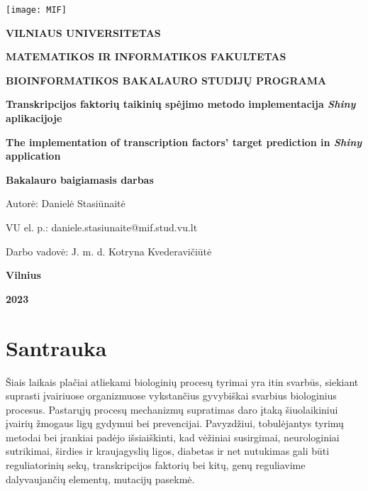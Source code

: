 \documentclass[12pt]{article}
\begin{document}

\begin{titlepage}
\vskip 20pt
\begin{center}
\texttt{[image: MIF]}
\end{center}


\vskip 20pt
\centerline{\bf \large \textbf{VILNIAUS UNIVERSITETAS}}
\bigskip
\centerline{\large \textbf{MATEMATIKOS IR INFORMATIKOS FAKULTETAS}}
\bigskip
\centerline{\large \textbf{BIOINFORMATIKOS BAKALAURO STUDIJŲ PROGRAMA}}



\vskip 90pt
\begin{center}
    {\bf \LARGE Transkripcijos faktorių taikinių spėjimo metodo implementacija
    \emph{Shiny} aplikacijoje}
\end{center}
\begin{center}
    {\bf \Large The implementation of transcription factors' target prediction
    in \emph{Shiny} application}
\end{center}
\vskip 20pt
\centerline{\bf \large \textbf{Bakalauro baigiamasis darbas}}
\bigskip
\vskip 40pt

\hskip 140pt {\large Autorė: Danielė Stasiūnaitė}

\hskip 140pt{\large VU el. p.: daniele.stasiunaite@mif.stud.vu.lt}
\bigskip
\vskip 20pt

\hskip 140pt {\large Darbo vadovė: J. m. d. Kotryna Kvederavičiūtė}
\vskip 60pt
\vskip 40pt
\centerline{\large \textbf{Vilnius}}
\centerline{\large \textbf{2023}}
\newpage
\end{titlepage}



\tableofcontents
\newpage


\section*{Santrauka}
Šiais laikais plačiai atliekami biologinių procesų tyrimai yra itin svarbūs,
siekiant suprasti įvairiuose organizmuose vykstančius gyvybiškai svarbius
biologinius procesus. Pastarųjų
procesų mechanizmų supratimas daro įtaką šiuolaikiniui įvairių žmogaus ligų
gydymui bei prevencijai. Pavyzdžiui, tobulėjantys tyrimų metodai bei įrankiai
padėjo išsiaiškinti, kad vėžiniai susirgimai, neurologiniai sutrikimai, širdies
ir kraujagyslių ligos, diabetas ir net nutukimas gali būti reguliatorinių sekų, 
transkripcijos faktorių bei kitų, genų reguliavime dalyvaujančių elementų,
mutacijų pasekmė\cite{ARTICLE0}.
\end{document}
